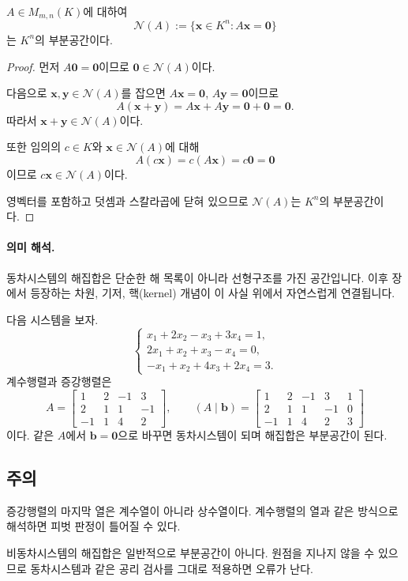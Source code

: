 \begin{theorem}
$A\in M_{m,n}(K)$에 대하여
\[
\mathcal{N}(A):=\{\mathbf{x}\in K^n: A\mathbf{x}=\mathbf{0}\}
\]
는 $K^n$의 부분공간이다.
\end{theorem}

\begin{proof}
먼저 $A\mathbf{0}=\mathbf{0}$이므로 $\mathbf{0}\in\mathcal{N}(A)$이다.

다음으로 $\mathbf{x},\mathbf{y}\in\mathcal{N}(A)$를 잡으면 $A\mathbf{x}=\mathbf{0}$, $A\mathbf{y}=\mathbf{0}$이므로
\[
A(\mathbf{x}+\mathbf{y})=A\mathbf{x}+A\mathbf{y}=\mathbf{0}+\mathbf{0}=\mathbf{0}.
\]
따라서 $\mathbf{x}+\mathbf{y}\in\mathcal{N}(A)$이다.

또한 임의의 $c\in K$와 $\mathbf{x}\in\mathcal{N}(A)$에 대해
\[
A(c\mathbf{x})=c(A\mathbf{x})=c\mathbf{0}=\mathbf{0}
\]
이므로 $c\mathbf{x}\in\mathcal{N}(A)$이다.

영벡터를 포함하고 덧셈과 스칼라곱에 닫혀 있으므로 $\mathcal{N}(A)$는 $K^n$의 부분공간이다.
\end{proof}

\paragraph{의미 해석.}
동차시스템의 해집합은 단순한 해 목록이 아니라 선형구조를 가진 공간입니다. 이후 장에서 등장하는 차원, 기저, 핵(kernel) 개념이 이 사실 위에서 자연스럽게 연결됩니다.

\begin{example}
다음 시스템을 보자.
\[
\begin{cases}
x_1+2x_2-x_3+3x_4=1,\\
2x_1+x_2+x_3-x_4=0,\\
-x_1+x_2+4x_3+2x_4=3.
\end{cases}
\]
계수행렬과 증강행렬은
\[
A=
\begin{bmatrix}
1&2&-1&3\\
2&1&1&-1\\
-1&1&4&2
\end{bmatrix},
\qquad
(A\mid \mathbf{b})=
\left[
\begin{array}{cccc|c}
1&2&-1&3&1\\
2&1&1&-1&0\\
-1&1&4&2&3
\end{array}
\right]
\]
이다. 같은 $A$에서 $\mathbf{b}=\mathbf{0}$으로 바꾸면 동차시스템이 되며 해집합은 부분공간이 된다.
\end{example}

\subsection*{주의}
\begin{warning}
증강행렬의 마지막 열은 계수열이 아니라 상수열이다. 계수행렬의 열과 같은 방식으로 해석하면 피벗 판정이 틀어질 수 있다.
\end{warning}
\begin{warning}
비동차시스템의 해집합은 일반적으로 부분공간이 아니다. 원점을 지나지 않을 수 있으므로 동차시스템과 같은 공리 검사를 그대로 적용하면 오류가 난다.
\end{warning}

